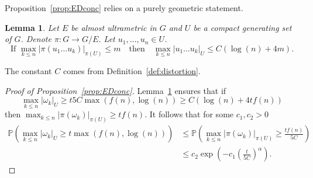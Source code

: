 \documentclass[11pt,leqno]{article}
\theoremstyle{plain}
\newtheorem{lemma}[theorem]{Lemma}
\theoremstyle{definition}
\theoremstyle{remark}
\numberwithin{equation}{section}
\begin{document}
Proposition~\ref{prop:EDconc} relies on a purely geometric statement.

\begin{lemma}\label{lem:ED}
Let $E$ be almost ultrametric in $G$ and $U$ be a compact generating set of $G$. Denote $\pi:G\to G/E$. Let $u_1,\dots,u_n \in U$. 
\[
\textrm{If }\max_{k\le n}|\pi(u_1\dots u_k)|_{\pi(U)} \le m \quad \textrm{then} \quad \max_{k\le n}|u_1\dots u_k|_U\le C(\log(n)+4m).
\]
\end{lemma}

The constant $C$ comes from Definition~\ref{def:distortion}.

\begin{proof}[Proof of Proposition~\ref{prop:EDconc}] %
Lemma~\ref{lem:ED} ensures that if 
\[
\max_{k\le n}|\omega_k|_U \ge t 5C\max(f(n),\log(n))\ge C(\log(n)+4tf(n))
\]
then $\max_{k\le n} |\pi(\omega_k)|_{\pi(U)} \ge tf(n)$. It follows that for some $c_1,c_2>0$
\begin{align*}
\mathbb{P} \left( \max_{k\le n}|\omega_k|_U \ge t \max(f(n),\log(n))
\right) &\le 
\mathbb{P} \left( \max_{k\le n}|\pi(\omega_k)|_{\pi(U)} \ge \frac{tf(n)}{5C}
\right) \\
&\le c_2 \exp\left(-c_1\left(\frac{t}{5C}\right)^\alpha \right).
\end{align*}
\end{proof}
\end{document}

